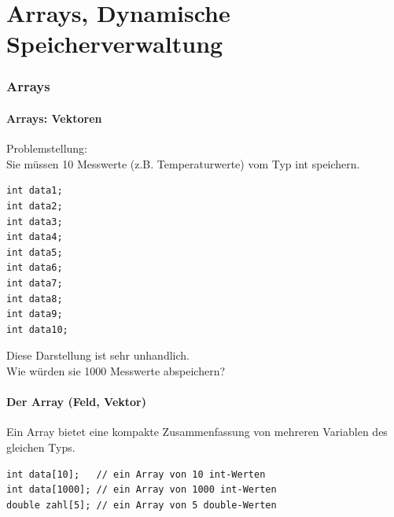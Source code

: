 
\part{Arrays, Dynamische Speicherverwaltung}
\label{sec:Arrays, Dynamische Speicherverwaltung}


\section{Arrays}
\label{sec:Arrays}

\subsection{Arrays: Vektoren}
\label{sec:Arrays: Vektoren}
Problemstellung:\\
Sie müssen 10 Messwerte (z.B. Temperaturwerte) vom Typ int speichern.
\noindent
\begin{minipage}{\linewidth}
\begin{lstlisting}
int data1;
int data2;
int data3;
int data4;
int data5;
int data6;
int data7;
int data8;
int data9;
int data10;
\end{lstlisting}
\end{minipage}

Diese Darstellung ist sehr unhandlich.\\
Wie würden sie 1000 Messwerte abspeichern?

\subsection{Der Array (Feld, Vektor)}
\label{sec:Der Array (Feld, Vektor)}
Ein Array bietet eine kompakte Zusammenfassung von mehreren Variablen des gleichen Typs.
\noindent
\begin{minipage}{\linewidth}
\begin{lstlisting}
int data[10];	// ein Array von 10 int-Werten
int data[1000];	// ein Array von 1000 int-Werten
double zahl[5];	// ein Array von 5 double-Werten
\end{lstlisting}
\end{minipage}

